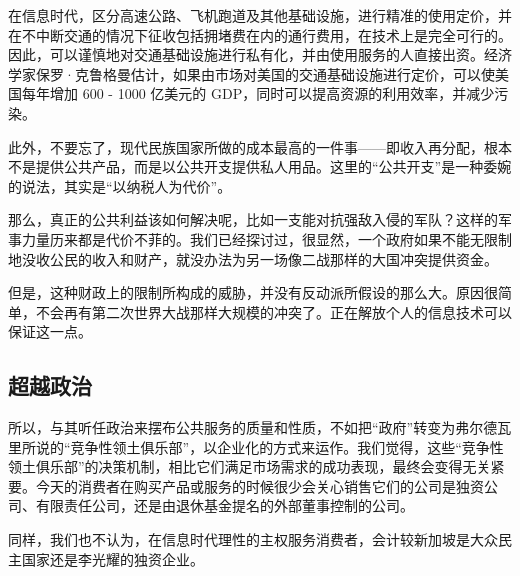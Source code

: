 在信息时代，区分高速公路、飞机跑道及其他基础设施，进行精准的使用定价，并在不中断交通的情况下征收包括拥堵费在内的通行费用，在技术上是完全可行的。因此，可以谨慎地对交通基础设施进行私有化，并由使用服务的人直接出资。经济学家保罗·克鲁格曼估计，如果由市场对美国的交通基础设施进行定价，可以使美国每年增加 600 - 1000 亿美元的 GDP，同时可以提高资源的利用效率，并减少污染。

此外，不要忘了，现代民族国家所做的成本最高的一件事——即收入再分配，根本不是提供公共产品，而是以公共开支提供私人用品。这里的“公共开支”是一种委婉的说法，其实是“以纳税人为代价”。

那么，真正的公共利益该如何解决呢，比如一支能对抗强敌入侵的军队？这样的军事力量历来都是代价不菲的。我们已经探讨过，很显然，一个政府如果不能无限制地没收公民的收入和财产，就没办法为另一场像二战那样的大国冲突提供资金。

但是，这种财政上的限制所构成的威胁，并没有反动派所假设的那么大。原因很简单，不会再有第二次世界大战那样大规模的冲突了。正在解放个人的信息技术可以保证这一点。

\subsection{超越政治}
所以，与其听任政治来摆布公共服务的质量和性质，不如把“政府”转变为弗尔德瓦里所说的“竞争性领土俱乐部”，以企业化的方式来运作。我们觉得，这些“竞争性领土俱乐部”的决策机制，相比它们满足市场需求的成功表现，最终会变得无关紧要。今天的消费者在购买产品或服务的时候很少会关心销售它们的公司是独资公司、有限责任公司，还是由退休基金提名的外部董事控制的公司。

同样，我们也不认为，在信息时代理性的主权服务消费者，会计较新加坡是大众民主国家还是李光耀的独资企业。